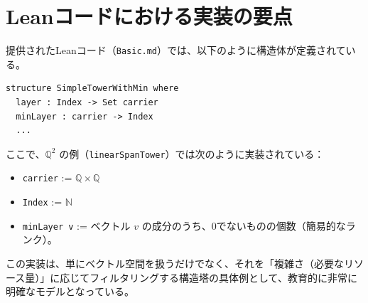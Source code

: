 \documentclass[11pt, a4paper]{article}
\begin{document}
\section{Leanコードにおける実装の要点}

提供されたLeanコード（\texttt{Basic.md}）では、以下のように構造体が定義されている。

\begin{verbatim}
structure SimpleTowerWithMin where
  layer : Index -> Set carrier
  minLayer : carrier -> Index
  ...
\end{verbatim}

ここで、$\mathbb{Q}^2$ の例（\texttt{linearSpanTower}）では次のように実装されている：

\begin{itemize}
    \item \texttt{carrier} := $\mathbb{Q} \times \mathbb{Q}$
    \item \texttt{Index} := $\mathbb{N}$
    \item \texttt{minLayer v} := ベクトル $v$ の成分のうち、0でないものの個数（簡易的なランク）。
\end{itemize}

この実装は、単にベクトル空間を扱うだけでなく、それを「複雑さ（必要なリソース量）」に応じてフィルタリングする構造塔の具体例として、教育的に非常に明確なモデルとなっている。
\end{document}

